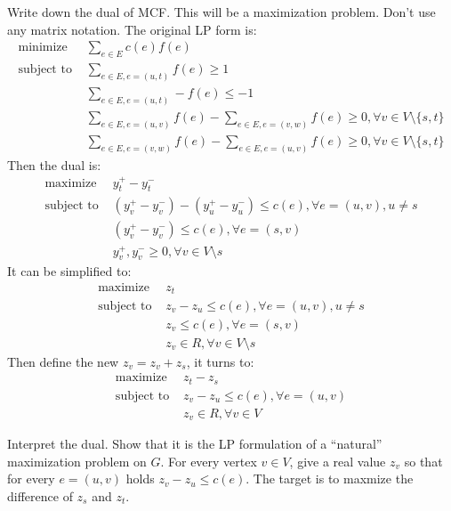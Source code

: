 \documentclass[11pt,a4paper,oneside]{article}
\begin{document}
\begin{problem}{3}
	\statement
    Write down the dual of MCF. This will be a maximization problem. Don't use any matrix notation.
    \solution
    The original LP form is:
	\begin{align*}
	\text{minimize } & \sum_{e\in E}c(e)f(e) \\
	\text{subject to } & \sum_{e\in E,e=(u,t)}f(e)\geq 1 \\
	& \sum_{e\in E,e=(u,t)}-f(e)\leq -1 \\
	& \sum_{e\in E,e=(u,v)}f(e)-\sum_{e\in E,e=(v,w)}f(e)\geq 0, 
	\forall v\in V\setminus \{s,t\} \\
	& \sum_{e\in E,e=(v,w)}f(e)-\sum_{e\in E,e=(u,v)}f(e)\geq 0, 
	\forall v\in V\setminus \{s,t\} 
	\end{align*}
	Then the dual is:
	\begin{align*}
	\text{maximize } & y_t^+-y_t^- \\
	\text{subject to } & (y_v^+-y_v^-)-(y_u^+-y_u^-)\leq c(e),\forall e=(u,v),u\neq s\\
	& (y_v^+-y_v^-)\leq c(e),\forall e=(s,v)\\
	& y_v^+,y_v^-\geq 0,\forall v\in V\setminus s 
	\end{align*}
	It can be simplified to:
	\begin{align*}
	\text{maximize } & z_t \\
	\text{subject to } & z_v-z_u\leq c(e),\forall e=(u,v),u\neq s\\
	& z_v\leq c(e),\forall e=(s,v)\\
	& z_v\in R,\forall v\in V\setminus s 
	\end{align*}
	Then define the new $z_v=z_v+z_s$, it turns to:
	\begin{align*}
	\text{maximize } & z_t-z_s \\
	\text{subject to } & z_v-z_u\leq c(e),\forall e=(u,v)\\
	& z_v\in R,\forall v\in V 
	\end{align*}
\end{problem}
\begin{problem}{4}
	\statement
   Interpret the dual. Show that it is the LP formulation of a ``natural'' maximization problem on $G$.
   \solution
	For every vertex $v\in V$, give a real value $z_v$ so that for every $e=(u,v)$ holds $z_v-z_u\leq c(e)$. The target is to maxmize the difference of $z_s$ and $z_t$.
\end{problem}
\end{document}
